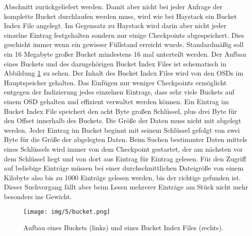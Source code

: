 \documentclass[12pt,oneside,a4paper,parskip]{scrbook}
\begin{document}
Abschnitt zurückgeliefert werden. Damit aber nicht bei jeder Anfrage der komplette Bucket durchlaufen werden muss, wird wie bei Haystack ein Bucket Index File angelegt. Im Gegensatz zu Haystack wird darin aber nicht jeder einzelne Eintrag festgehalten sondern nur einige Checkpoints abgespeichert. Dies geschieht immer wenn ein gewisser Füllstand erreicht wurde. Standardmäßig soll ein 16 Megabyte großer Bucket mindestens 16 mal unterteilt werden. Der Aufbau eines Buckets und des dazugehörigen Bucket Index Files ist schematisch in Abbildung \ref{bucket} zu sehen. Der Inhalt des Bucket Index Files wird von den OSDs im Hauptspeicher gehalten. Das Einfügen nur weniger Checkpoints ermöglicht entgegen der Indizierung jedes einzelnen Eintrags, dass sehr viele Buckets auf einem OSD gehalten und effizient verwaltet werden können. Ein Eintrag im Bucket Index File speichert den acht Byte großen Schlüssel, plus drei Byte für den Offset innerhalb des Buckets. Die Größe der Daten muss nicht mit abgelegt werden. Jeder Eintrag im Bucket beginnt mit seinem Schlüssel gefolgt von zwei Byte für die Größe der abgelegten Daten. Beim Suchen bestimmter Daten mittels eines Schlüssels wird immer von dem Checkpoint gestartet, der am nächsten vor dem Schlüssel liegt und von dort aus Eintrag für Eintrag gelesen. Für den Zugriff auf beliebige Einträge müssen bei einer durchschnittlichen Dateigröße von einem Kilobyte also bis zu 1000 Einträge gelesen werden, bis der richtige gefunden ist. Dieser Suchvorgang fällt aber beim Lesen mehrerer Einträge am Stück nicht mehr besonders ins Gewicht.

\begin{figure}
  \centering
  \texttt{[image: img/5/bucket.png]}
  \caption[Aufbau eines Buckets und dem Bucket Index Files]{ Aufbau eines Buckets (links) und eines Bucket Index Files (rechts).}
  \label{bucket}
\end{figure}
\end{document}
